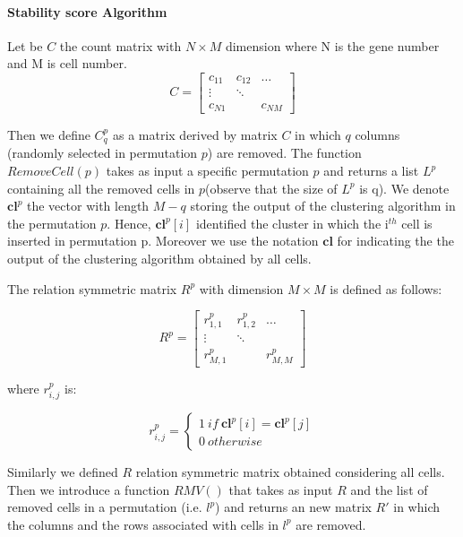 \documentclass[12pt]{article}
\begin{document}
\setcounter{page}{41}



\paragraph{Stability score Algorithm}
Let be $C$ the count matrix with $N \times M $ dimension where N is the gene number and M is cell number.
\[
C = \begin{bmatrix} 
    c_{11} & c_{12} & \dots \\
    \vdots & \ddots & \\
    c_{N1} &        & c_{NM} 
    \end{bmatrix}
\]

Then we define $C^p_q$ as a matrix derived by matrix $C$ in which $q$ columns (randomly selected in permutation $p$) are removed.
The function $RemoveCell(p)$ takes as input a specific permutation $p$ and returns a list $L^p$ containing all the removed cells in $p$(observe that the size of $L^p$ is q).
We denote  $\textbf{cl}^p$ the vector with length $M-q$ storing the output of the clustering algorithm in the permutation $p$. Hence, $\textbf{cl}^p[i]$ identified the cluster in which the i$^{th}$ cell is inserted in permutation p.
Moreover we use the notation  $\textbf{cl}$ for indicating the  the output of the clustering algorithm obtained by all cells.


The relation symmetric matrix $R^p$  with dimension $M \times M$ is defined as follows: 

\[
R^p = \begin{bmatrix} 
    r^p_{1,1} & r^p_{1,2} & \dots \\
    \vdots & \ddots & \\
    r^p_{M,1} &        & r^p_{M,M} 
    \end{bmatrix}
\]

where $r^p_{i,j}$ is:

 \[
   r^p_{i,j}=\left\{
                \begin{array}{ll}
                 1 \ if \ \textbf{cl}^p[i]=\textbf{cl}^p[j]\\
                 0 \ otherwise 
                \end{array}
              \right.
  \]
  
Similarly we defined  $R$   relation symmetric matrix obtained considering  all  cells.
Then we introduce a function $RMV()$ that takes as input $R$ and the list of removed cells in   a permutation (i.e. $l^p$) and returns an new matrix $R'$ in which the columns and the rows associated with cells in  $l^p$ are removed.
\end{document}
